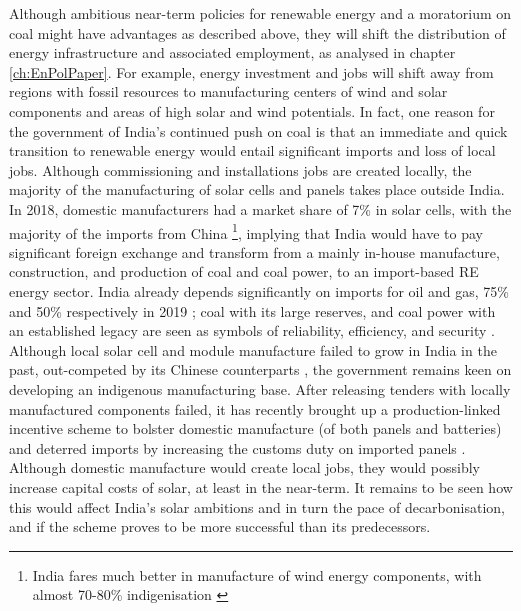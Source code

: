 \documentclass[../thesis.tex]{subfiles}
\begin{document}
Although ambitious near-term policies for renewable energy and a moratorium on coal might have advantages as described above, they will shift the distribution of energy infrastructure and associated employment, as analysed in chapter \ref{ch:EnPolPaper}. For example, energy investment and jobs will shift away from regions with fossil resources to manufacturing centers of wind and solar components and areas of high solar and wind potentials. In fact, one reason for the government of India's continued push on coal is that an immediate and quick transition to renewable energy would entail significant imports and loss of local jobs. Although commissioning and installations jobs are created locally, the majority of the manufacturing of solar cells and panels takes place outside India. In 2018, domestic manufacturers had a market share of 7\% \citep{singh} in solar cells, with the majority of the imports from China \footnote{India fares much better in manufacture of wind energy components, with almost 70-80\% indigenisation \citep{ministryofnewandrenewableenergy2021a}}, implying that India would have to pay significant foreign exchange and transform from a mainly in-house manufacture, construction, and production of coal and coal power, to an import-based RE energy sector. India already depends significantly on imports for oil and gas, 75\% and 50\% respectively in 2019 \citep{iea2021}; coal with its large reserves, and coal power with an established legacy are seen as symbols of reliability, efficiency, and security \citep{montrone2021}. Although local solar cell and module manufacture failed to grow in India in the past, out-competed by its Chinese counterparts \citep{irena2019}, the government remains keen on developing an indigenous manufacturing base. After releasing tenders with locally manufactured components failed, it has recently brought up a production-linked incentive scheme to bolster domestic manufacture (of both panels and batteries) and deterred imports by increasing the customs duty on imported panels \citep{carboncopy2021,carboncopy2021a,carboncopy2021b}. Although domestic manufacture would create local jobs, they would possibly increase capital costs of solar, at least in the near-term. It remains to be seen how this would affect India's solar ambitions and in turn the pace of decarbonisation, and if the scheme proves to be more successful than its predecessors.
\end{document}
